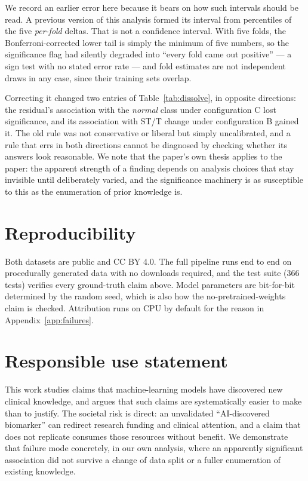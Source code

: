 \documentclass{article}
\begin{document}
We record an earlier error here because it bears on how such intervals should be
read. A previous version of this analysis formed its interval from percentiles
of the five \emph{per-fold} deltas. That is not a confidence interval. With five
folds, the Bonferroni-corrected lower tail is simply the minimum of five
numbers, so the significance flag had silently degraded into ``every fold came
out positive'' --- a sign test with no stated error rate --- and fold estimates
are not independent draws in any case, since their training sets overlap.

Correcting it changed two entries of Table~\ref{tab:dissolve}, in opposite
directions: the residual's association with the \emph{normal} class under
configuration C lost significance, and its association with ST/T change under
configuration B gained it. The old rule was not conservative or liberal but
simply uncalibrated, and a rule that errs in both directions cannot be diagnosed
by checking whether its answers look reasonable. We note that the paper's own
thesis applies to the paper: the apparent strength of a finding depends on
analysis choices that stay invisible until deliberately varied, and the
significance machinery is as susceptible to this as the enumeration of prior
knowledge is.

\section{Reproducibility}
\label{app:repro}

Both datasets are public and CC BY 4.0. The full pipeline runs end to end on
procedurally generated data with no downloads required, and the test suite
(366 tests) verifies every ground-truth claim above. Model parameters are
bit-for-bit determined by the random seed, which is also how the
no-pretrained-weights claim is checked. Attribution runs on CPU by default for
the reason in Appendix~\ref{app:failures}.

\section*{Responsible use statement}

This work studies claims that machine-learning models have discovered new
clinical knowledge, and argues that such claims are systematically easier to
make than to justify. The societal risk is direct: an unvalidated
``AI-discovered biomarker'' can redirect research funding and clinical attention,
and a claim that does not replicate consumes those resources without benefit. We
demonstrate that failure mode concretely, in our own analysis, where an
apparently significant association did not survive a change of data split or a
fuller enumeration of existing knowledge.
\end{document}
